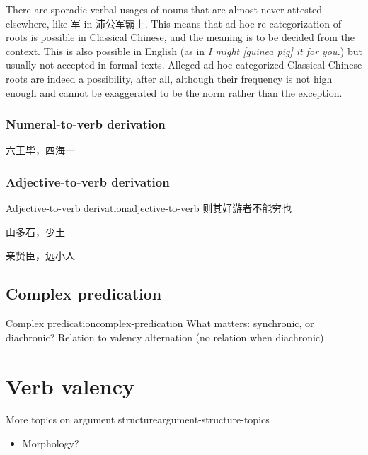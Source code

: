 \documentclass[UTF8, a4paper, oneside, scheme=plain, 12pt]{ctexrep}
\newcommand{\form}[1]{\emph{#1}}
\begin{document}
There are sporadic verbal usages of nouns that are almost never attested elsewhere,
like 军 in 沛公军霸上.
This means that ad hoc re-categorization of roots is possible in Classical Chinese,
and the meaning is to be decided from the context.
This is also possible in English
(as in \form{I might [guinea pig] it for you.}) 
but usually not accepted in formal texts.
Alleged ad hoc categorized Classical Chinese roots are indeed a possibility, after all,
although their frequency is not high enough and cannot be exaggerated to be the norm rather than the exception.

\subsection{Numeral-to-verb derivation}

\begin{exe}
    \ex 六王毕，四海一
\end{exe}

\subsection{Adjective-to-verb derivation}

\begin{todobox}{Adjective-to-verb derivation}{adjective-to-verb}
    则其好游者不能穷也

    山多石，少土

    亲贤臣，远小人
\end{todobox}

\section{Complex predication}

\begin{todobox}{Complex predication}{complex-predication}
    What matters: synchronic, or diachronic? Relation to valency alternation (no relation when diachronic)
\end{todobox}

\chapter{Verb valency}

\begin{todobox}{More topics on argument structure}{argument-structure-topics}
    \begin{itemize}
        \item Morphology?
    \end{itemize}
\end{todobox}
\end{document}
